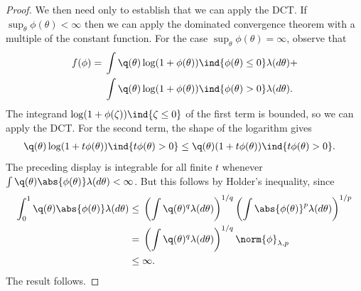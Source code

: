 \begin{lem}
\begin{proof}
We then need only to establish that we can apply the DCT. If $\sup_\theta
\phi(\theta) < \infty$ then we can apply the dominated convergence theorem with
a multiple of the constant function.  For the case $\sup_\theta \phi(\theta) =
\infty$, observe that
%
\begin{align*}
%
f(\phi) ={}&
    \int \q(\theta) \log(1 + \phi(\theta)) \ind{\phi(\theta) \le 0}
        \lambda(d\theta) + \\
    &\int \q(\theta) \log(1 + \phi(\theta)) \ind{\phi(\theta) > 0}
        \lambda(d\theta).
%
\end{align*}
%
The integrand $\log(1 + \phi(\zeta)) \ind{\zeta \le 0}$ of the first term
is bounded, so we can apply the DCT.  For the second term, the shape of
the logarithm gives
%
\begin{align*}
%
\q(\theta) \log(1 + t \phi(\theta)) \ind{t \phi(\theta) > 0}   \le{}&
    \q(\theta) (1 + t \phi(\theta)) \ind{t \phi(\theta) > 0}.%
\end{align*}
%
The preceding display is integrable for all finite $t$ whenever $\int \q(\theta)
\abs{\phi(\theta)} \lambda(d\theta) < \infty$. But this follows by Holder's
inequality, since
%
\begin{align*}
%
\int_0^1 \q(\theta) \abs{\phi(\theta)} \lambda(d \theta) \le{}&
    \left( \int \q(\theta)^q \lambda(d \theta) \right)^{1/q}
    \left( \int \abs{\phi(\theta)}^p \lambda(d \theta) \right)^{1/p}
\\={}&
    \left( \int \q(\theta)^q \lambda(d \theta) \right)^{1/q}
    \norm{\phi}_{\lambda,p}
\\\le{}&
    \infty.
%
\end{align*}
%
The result follows.
%
\end{proof}
%
\end{lem}
